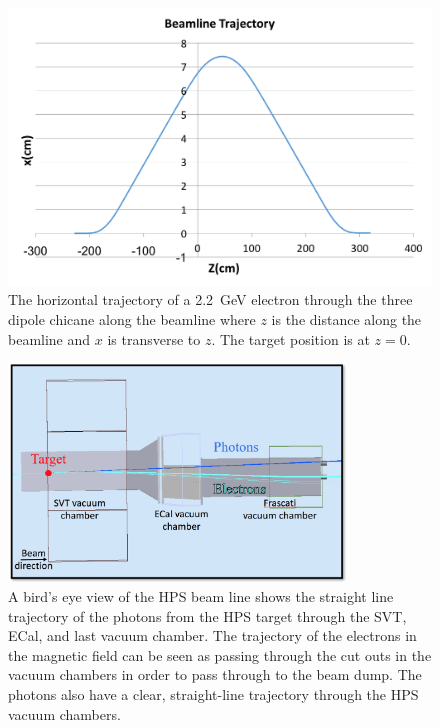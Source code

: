 \begin{figure}[htb]
  \centering
      \includegraphics[width=1.0\textwidth]{pics/experiment/feetrajectory.png}
  \caption[Charged particle trajectory in HPS beamline]{The horizontal trajectory of a 2.2~GeV electron through the three dipole chicane along the beamline where $z$ is the distance along the beamline and $x$ is transverse to $z$. The target position is at $z=0$.}
  \label{Figure:trajectory}
\end{figure}

\begin{figure}[htb]
  \centering
      \includegraphics[width=0.8\textwidth]{pics/experiment/hpsbeam_v2.png}
  \caption[HPS beamline simulation in GEMC]{A bird's eye view of the HPS beam line shows the straight line trajectory of the photons from the HPS target through the SVT, ECal, and last vacuum chamber. The trajectory of the electrons in the magnetic field can be seen as passing through the cut outs in the vacuum chambers in order to pass through to the beam dump. The photons also have a clear, straight-line trajectory through the HPS vacuum chambers.}
  \label{Figure:gemc}
\end{figure}

